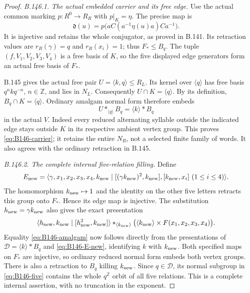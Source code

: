 \begin{proof}
\emph{B.146.1. The actual embedded carrier and its free edge.}
Use the actual common marking $p:R^0\to R_R$ with $p|_K=\eta$.
The precise map is
\begin{equation}\label{eq:B146-d-map}
 \mathfrak d(u)=p\bigl(aC(a^{-1}\eta(u)a)Ca^{-1}\bigr).
\end{equation}
It is injective and retains the whole conjugator, as proved in
B.141. Its retraction values are
$r_R(\gamma)=q$ and $r_R(x_i)=1$; thus $F_*\leq B_q$.
The tuple $(f,V_1,V_2,V_3,V_4)$ is a free basis of $K$, so the
five displayed edge generators form an actual free basis of $F_*$.

B.145 gives the actual free pair $U=\langle k,q\rangle\leq R_L$.
Its kernel over $\langle q\rangle$ has free basis
$q^nkq^{-n}$, $n\in\mathbb Z$, and lies in $N_L$.
Consequently $U\cap K=\langle q\rangle$. By its definition,
$B_q\cap K=\langle q\rangle$. Ordinary amalgam normal form
therefore embeds
\[
 U*_{\langle q\rangle}B_q
       =\langle k\rangle*B_q
\]
in the actual $V$. Indeed every reduced alternating syllable
outside the indicated edge stays outside $K$ in its respective
ambient vertex group. This proves \eqref{eq:B146-carrier}; it
retains the entire $N_R$, not a selected finite family of words.
It also agrees with the ordinary retraction in B.145.

\emph{B.146.2. The complete internal five-relation filling.}
Define
\begin{equation}\label{eq:B146-E-new}
 E_{\rm new}=\langle\gamma,x_1,x_2,x_3,x_4,k_{\rm new}
 \mid[(\gamma k_{\rm new})^2,k_{\rm new}],
       [k_{\rm new},x_i]\ (1\leq i\leq4)\rangle.
\end{equation}
The homomorphism $k_{\rm new}\mapsto1$ and the identity on the
other five letters retracts this group onto $F_*$. Hence its
edge map is injective. The substitution
$h_{\rm new}=\gamma k_{\rm new}$ also gives the exact presentation
\[
 \langle h_{\rm new},k_{\rm new}\mid
                     [h_{\rm new}^{2},k_{\rm new}]\rangle
 *_{\langle k_{\rm new}\rangle}
 \bigl(\langle k_{\rm new}\rangle\times F(x_1,x_2,x_3,x_4)\bigr).
\]
Equality \eqref{eq:B146-amalgam} now follows directly from the
presentations of $\mathscr D=\langle k\rangle*B_q$ and
\eqref{eq:B146-E-new}, identifying $k$ with $k_{\rm new}$.
Both specified maps on $F_*$ are injective, so ordinary reduced
normal form embeds both vertex groups. There is also a retraction
to $B_q$ killing $k_{\rm new}$. Since $q\in\mathscr D$, its
normal subgroup in \eqref{eq:B146-five} contains the whole
$q^{\mathbb Z}$ orbit of all five relations. This is a complete
internal assertion, with no truncation in the exponent.


\end{proof}
